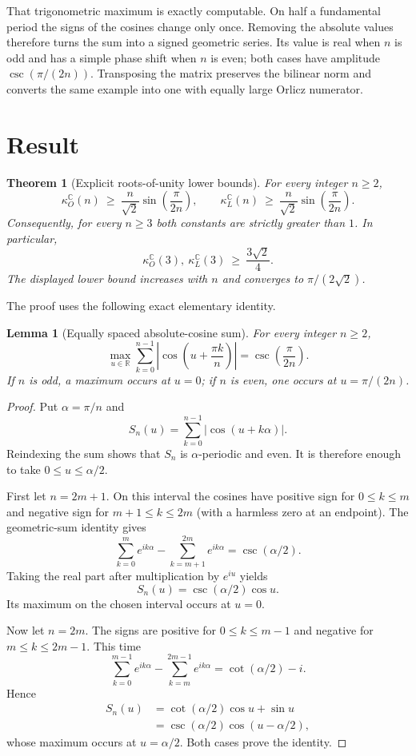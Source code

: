 \documentclass[11pt]{article}
\newtheorem{theorem}{Theorem}
\newtheorem{lemma}{Lemma}
\theoremstyle{remark}
\newcommand{\kO}{\kappa_{O}^{\mathbb C}}
\newcommand{\kL}{\kappa_{L}^{\mathbb C}}
\begin{document}
That trigonometric maximum is exactly computable. On half a fundamental
period the signs of the cosines change only once. Removing the absolute
values therefore turns the sum into a signed geometric series. Its value is
real when $n$ is odd and has a simple phase shift when $n$ is even; both
cases have amplitude $\csc(\pi/(2n))$. Transposing the matrix preserves the
bilinear norm and converts the same example into one with equally large
Orlicz numerator.

\section{Result}

\begin{theorem}[Explicit roots-of-unity lower bounds]
\label{thm:main}
For every integer $n\ge2$,
\[
 \boxed{\quad
 \kO(n)\ \ge\ \frac{n}{\sqrt2}\sin\!\left(\frac{\pi}{2n}\right),
 \qquad
 \kL(n)\ \ge\ \frac{n}{\sqrt2}\sin\!\left(\frac{\pi}{2n}\right).
 \quad}
\]
Consequently, for every $n\ge3$ both constants are strictly greater than
$1$. In particular,
\[
               \kO(3),\ \kL(3)\ \ge\ \frac{3\sqrt2}{4}.
\]
The displayed lower bound increases with $n$ and converges to
$\pi/(2\sqrt2)$.
\end{theorem}

The proof uses the following exact elementary identity.

\begin{lemma}[Equally spaced absolute-cosine sum]
\label{lem:cosine}
For every integer $n\ge2$,
\[
 \max_{u\in\mathbb R}\sum_{k=0}^{n-1}
       \left|\cos\!\left(u+\frac{\pi k}{n}\right)\right|
     =\csc\!\left(\frac{\pi}{2n}\right).
\]
If $n$ is odd, a maximum occurs at $u=0$; if $n$ is even, one occurs at
$u=\pi/(2n)$.
\end{lemma}

\begin{proof}
Put $\alpha=\pi/n$ and
\[
                 S_n(u)=\sum_{k=0}^{n-1}|\cos(u+k\alpha)|.
\]
Reindexing the sum shows that $S_n$ is $\alpha$-periodic and even. It is
therefore enough to take $0\le u\le\alpha/2$.

First let $n=2m+1$. On this interval the cosines have positive sign for
$0\le k\le m$ and negative sign for $m+1\le k\le2m$ (with a harmless zero
at an endpoint). The geometric-sum identity gives
\[
 \sum_{k=0}^{m}e^{ik\alpha}-\sum_{k=m+1}^{2m}e^{ik\alpha}
       =\csc(\alpha/2).
\]
Taking the real part after multiplication by $e^{iu}$ yields
\[
                  S_n(u)=\csc(\alpha/2)\cos u.
\]
Its maximum on the chosen interval occurs at $u=0$.

Now let $n=2m$. The signs are positive for $0\le k\le m-1$ and negative for
$m\le k\le2m-1$. This time
\[
 \sum_{k=0}^{m-1}e^{ik\alpha}-\sum_{k=m}^{2m-1}e^{ik\alpha}
       =\cot(\alpha/2)-i.
\]
Hence
\begin{align*}
 S_n(u)
   &=\cot(\alpha/2)\cos u+\sin u\\
   &=\csc(\alpha/2)\cos(u-\alpha/2),
\end{align*}
whose maximum occurs at $u=\alpha/2$. Both cases prove the identity.
\end{proof}
\end{document}
